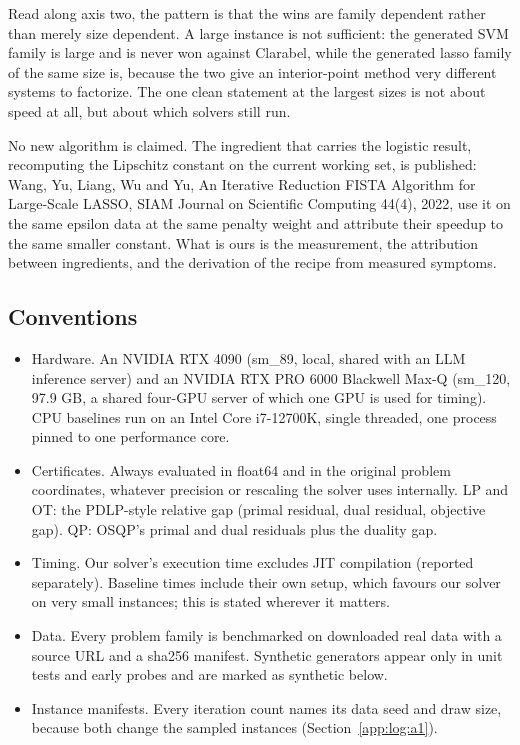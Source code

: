 Read along axis two, the pattern is that the wins are family dependent rather
than merely size dependent. A large instance is not sufficient: the generated
SVM family is large and is never won against Clarabel, while the generated
lasso family of the same size is, because the two give an interior-point
method very different systems to factorize. The one clean statement at the
largest sizes is not about speed at all, but about which solvers still run.

No new algorithm is claimed. The ingredient that carries the logistic result,
recomputing the Lipschitz constant on the current working set, is published:
Wang, Yu, Liang, Wu and Yu, An Iterative Reduction FISTA Algorithm for
Large-Scale LASSO, SIAM Journal on Scientific Computing 44(4), 2022, use it on
the same epsilon data at the same penalty weight and attribute their speedup
to the same smaller constant. What is ours is the measurement, the attribution
between ingredients, and the derivation of the recipe from measured symptoms.

\subsection{Conventions}
\label{app:log:conventions}

\begin{itemize}
\item Hardware. An NVIDIA RTX 4090 (sm\_89, local, shared with an LLM
  inference server) and an NVIDIA RTX PRO 6000 Blackwell Max-Q (sm\_120,
  97.9 GB, a shared four-GPU server of which one GPU is used for timing).
  CPU baselines run on an Intel Core i7-12700K, single threaded, one process
  pinned to one performance core.
\item Certificates. Always evaluated in float64 and in the original problem
  coordinates, whatever precision or rescaling the solver uses internally.
  LP and OT: the PDLP-style relative gap (primal residual, dual residual,
  objective gap). QP: OSQP's primal and dual residuals plus the duality gap.
\item Timing. Our solver's execution time excludes JIT compilation (reported
  separately). Baseline times include their own setup, which favours our
  solver on very small instances; this is stated wherever it matters.
\item Data. Every problem family is benchmarked on downloaded real data with
  a source URL and a sha256 manifest. Synthetic generators appear only in
  unit tests and early probes and are marked as synthetic below.
\item Instance manifests. Every iteration count names its data seed and draw
  size, because both change the sampled instances (Section~\ref{app:log:a1}).
\end{itemize}

